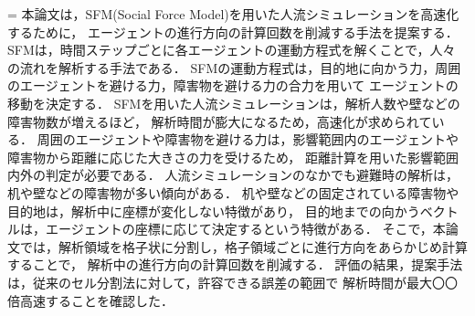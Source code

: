 \fi


={
本論文は，SFM(Social Force Model)を用いた人流シミュレーションを高速化するために，
エージェントの進行方向の計算回数を削減する手法を提案する．
SFMは，時間ステップごとに各エージェントの運動方程式を解くことで，人々の流れを解析する手法である．
SFMの運動方程式は，目的地に向かう力，周囲のエージェントを避ける力，障害物を避ける力の合力を用いて
エージェントの移動を決定する．
SFMを用いた人流シミュレーションは，解析人数や壁などの障害物数が増えるほど，
解析時間が膨大になるため，高速化が求められている．
周囲のエージェントや障害物を避ける力は，影響範囲内のエージェントや障害物から距離に応じた大きさの力を受けるため，
距離計算を用いた影響範囲内外の判定が必要である．
人流シミュレーションのなかでも避難時の解析は，机や壁などの障害物が多い傾向がある．
机や壁などの固定されている障害物や目的地は，解析中に座標が変化しない特徴があり，
目的地までの向かうベクトルは，エージェントの座標に応じて決定するという特徴がある．
そこで，本論文では，解析領域を格子状に分割し，格子領域ごとに進行方向をあらかじめ計算することで，
解析中の進行方向の計算回数を削減する．
評価の結果，提案手法は，従来のセル分割法に対して，許容できる誤差の範囲で
解析時間が最大〇〇倍高速することを確認した．
}
\fi


%

